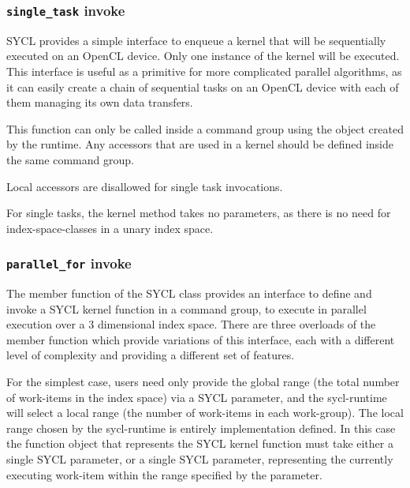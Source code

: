 %


\subsubsection{\texttt{single_task} invoke}

SYCL provides a simple interface to enqueue a kernel that will be
sequentially executed on an OpenCL device. Only one instance of the
kernel will be executed. This interface is useful as a primitive for more
complicated parallel algorithms, as it can easily create a chain of
sequential tasks on an OpenCL device with each of them managing its
own data transfers.

This function can only be called inside a command group using the
 object created by the runtime.
Any accessors that are used in a kernel should be defined inside the
same command group.

Local accessors are disallowed for single task invocations.



For single tasks, the kernel method takes no parameters, as there
is no need for \gls{index-space-classes} in a unary index space.

\subsubsection{\texttt{parallel_for} invoke}

The  member function of the SYCL  class provides
an interface to define and invoke a SYCL kernel function in a command group, to execute in
parallel execution over a 3 dimensional index space.
There are three overloads of the  member function which provide
variations of this interface, each with a different level of complexity and providing a
different set of features.

For the simplest case, users need only provide the global range (the total number of work-items in the index space) via a SYCL  parameter, and the \gls{sycl-runtime} will select a local range (the number of work-items in each work-group).
The local range chosen by the \gls{sycl-runtime} is entirely implementation defined.
In this case the function object that represents the SYCL kernel function must take either a single SYCL  parameter, or a single SYCL  parameter, representing the currently executing work-item within the range specified by the  parameter.

